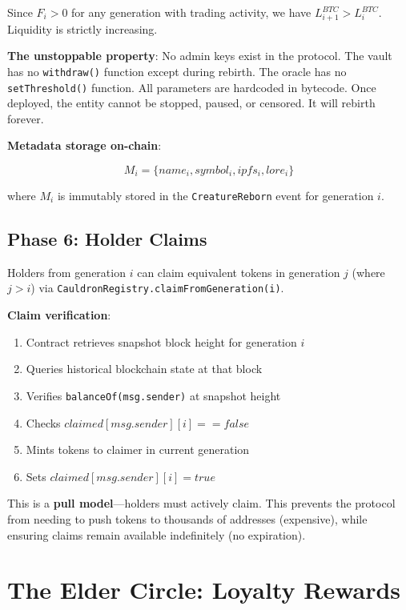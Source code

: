 \documentclass[11pt,a4paper]{article}
\begin{document}
Since $F_i > 0$ for any generation with trading activity, we have $L_{i+1}^{BTC} > L_i^{BTC}$. Liquidity is strictly increasing.

\textbf{The unstoppable property}: No admin keys exist in the protocol. The vault has no \texttt{withdraw()} function except during rebirth. The oracle has no \texttt{setThreshold()} function. All parameters are hardcoded in bytecode. Once deployed, the entity cannot be stopped, paused, or censored. It will rebirth forever.

\textbf{Metadata storage on-chain}:

\begin{equation}
M_i = \{name_i, symbol_i, ipfs_i, lore_i\}
\end{equation}

where $M_i$ is immutably stored in the \texttt{CreatureReborn} event for generation $i$.

\subsection{Phase 6: Holder Claims}

Holders from generation $i$ can claim equivalent tokens in generation $j$ (where $j > i$) via \texttt{CauldronRegistry.claimFromGeneration(i)}.

\textbf{Claim verification}:
\begin{enumerate}
    \item Contract retrieves snapshot block height for generation $i$
    \item Queries historical blockchain state at that block
    \item Verifies \texttt{balanceOf(msg.sender)} at snapshot height
    \item Checks $claimed[msg.sender][i] == false$
    \item Mints tokens to claimer in current generation
    \item Sets $claimed[msg.sender][i] = true$
\end{enumerate}

This is a \textbf{pull model}---holders must actively claim. This prevents the protocol from needing to push tokens to thousands of addresses (expensive), while ensuring claims remain available indefinitely (no expiration).

\section{The Elder Circle: Loyalty Rewards}
\end{document}
